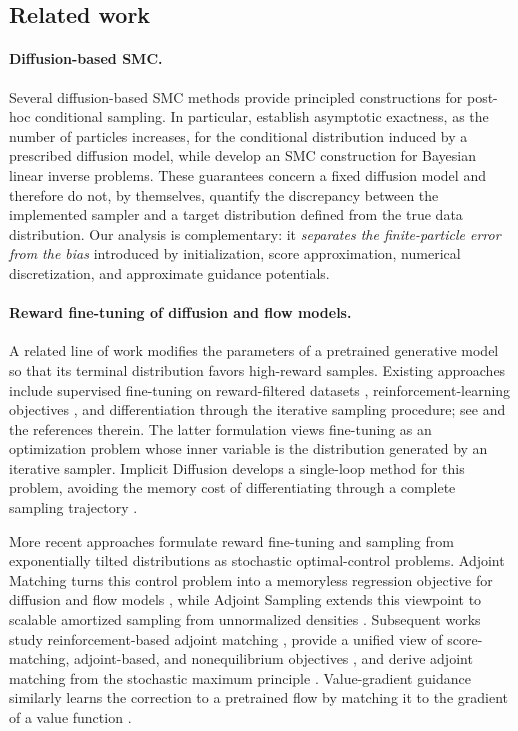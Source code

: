 \documentclass[11pt]{article}
\theoremstyle{plain}
\theoremstyle{definition}
\theoremstyle{remark}
\begin{document}
\subsection{Related work}


\paragraph{Diffusion-based SMC.}
Several diffusion-based SMC methods provide principled constructions for
post-hoc conditional sampling. In particular, \citet{wu2023practical}
establish asymptotic exactness, as the number of particles increases, for
the conditional distribution induced by a prescribed diffusion model,
while \citet{cardoso2024monte} develop an SMC construction for Bayesian
linear inverse problems. These guarantees concern a fixed diffusion model
and therefore do not, by themselves, quantify the discrepancy between the
implemented sampler and a target distribution defined from the true data
distribution. Our analysis is complementary: it \textit{separates the
finite-particle error from the bias} introduced by initialization, score
approximation, numerical discretization, and approximate guidance
potentials.

\paragraph{Reward fine-tuning of diffusion and flow models.}
A related line of work modifies the parameters of a pretrained generative
model so that its terminal distribution favors high-reward samples.
Existing approaches include supervised fine-tuning on reward-filtered
datasets \citep{wu2023human}, reinforcement-learning objectives
\citep{fan2023dpok,black2024training}, and differentiation through the
iterative sampling procedure; see \citet{marion2025implicit} and the
references therein. The latter formulation views fine-tuning as an
optimization problem whose inner variable is the distribution generated
by an iterative sampler. Implicit Diffusion develops a single-loop method
for this problem, avoiding the memory cost of differentiating through a
complete sampling trajectory \citep{marion2025implicit}.

More recent approaches formulate reward fine-tuning and sampling from
exponentially tilted distributions as stochastic optimal-control
problems. Adjoint Matching turns this control problem into a memoryless
regression objective for diffusion and flow models
\citep{domingo2025adjoint}, while Adjoint Sampling extends this viewpoint
to scalable amortized sampling from unnormalized densities
\citep{havens2025adjoint}. Subsequent works study reinforcement-based
adjoint matching \citep{bergmeister2026reinforce}, provide a unified view
of score-matching, adjoint-based, and nonequilibrium objectives
\citep{domingo2026unified}, and derive adjoint matching from the
stochastic maximum principle \citep{domingo2026smp}. Value-gradient
guidance similarly learns the correction to a pretrained flow by matching
it to the gradient of a value function \citep{liu2025valuegradient}.
\end{document}
